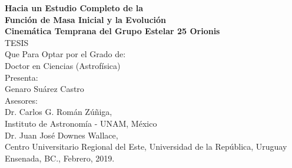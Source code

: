 \documentclass[12pt]{article}
\begin{document}
\vspace*{0mm}
\begin{center}
{\Large \textbf{Hacia un Estudio Completo de la}}\\ \vspace*{2mm}
{\Large \textbf{Funci\'on de Masa Inicial y la Evoluci\'on}}\\ \vspace*{2mm}
{\Large \textbf{Cinem\'atica Temprana del Grupo Estelar 25 Orionis}}\\
\vspace*{10mm}
{\huge TESIS}\\
\vspace*{5mm}
{\Large Que Para Optar por el Grado de:} \\
\vspace*{1mm}
{\Large Doctor en Ciencias (Astrof\'isica)}\\
\vspace*{10mm}
{\Large Presenta:}\\
\vspace*{5mm}
{\Large Genaro Su\'arez Castro}\\
\vspace*{10mm}
{\Large Asesores:}\\
\vspace*{3mm}
{\Large Dr. Carlos G. Rom\'an Z\'u\~niga,} \\ {\large Instituto de Astronom\'ia - UNAM, M\'exico} \\
\vspace*{2mm}
{\Large Dr. Juan Jos\'e Downes Wallace,} \\ {\large Centro Universitario Regional del Este, Universidad de la Rep\'ublica, Uruguay} \\
\vspace*{8mm}
{\Large Ensenada, BC., Febrero, 2019.}

\end{center}
\end{document}
